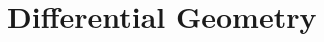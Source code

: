 \documentclass[11pt,openany]{article}
\begin{document}

%		
%		
%		

\newpage
\appendix
\section{Differential Geometry}
\end{document}
